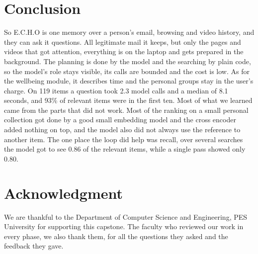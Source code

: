 \documentclass[conference]{IEEEtran}
\begin{document}
\section{Conclusion}\label{sec:conc}
So E.C.H.O is one memory over a person's email, browsing and video history, and they can ask it questions. All legitimate mail it keeps, but only the pages and videos that got attention, everything is on the laptop and gets prepared in the background. The planning is done by the model and the searching by plain code, so the model's role stays visible, its calls are bounded and the cost is low. As for the wellbeing module, it describes time and the personal groups stay in the user's charge. On 119 items a question took 2.3 model calls and a median of 8.1 seconds, and 93\% of relevant items were in the first ten. Most of what we learned came from the parts that did not work. Most of the ranking on a small personal collection got done by a good small embedding model and the cross encoder added nothing on top, and the model also did not always use the reference to another item. The one place the loop did help was recall, over several searches the model got to see 0.86 of the relevant items, while a single pass showed only 0.80.

\section*{Acknowledgment}
We are thankful to the Department of Computer Science and Engineering, PES University for supporting this capstone. The faculty who reviewed our work in every phase, we also thank them, for all the questions they asked and the feedback they gave.
\end{document}

